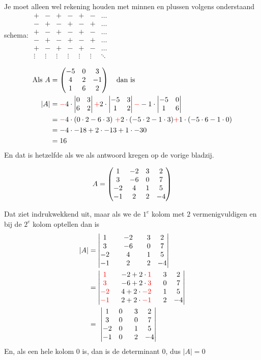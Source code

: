 Je moet alleen wel rekening houden met minnen en plussen volgens onderstaand schema:
$ \begin{matrix}
    +  & - & + & - & + & - & \ldots \\
    -  & + & - & + & - & + & \ldots \\
    +  & - & + & - & + & - & \ldots \\
    -  & + & - & + & - & + & \ldots \\
    +  & - & + & - & + & - & \ldots \\
    \vdots & \vdots & \vdots & \vdots & \vdots & \vdots & \ddots
\end{matrix}  $

\begin{align*}
    	\text{Als } A &= \matdrie{-5 & 0 & 3}{4 & 2 & -1}{1 & 6 & 2} \quad \text{dan is} \\ 
    	         |A| &= \red{-}4\cdot  \dettwee{0 & 3}{6 & 2 }  
                         \red{+}2\cdot  \dettwee{-5 & 3}{1 & 2 }
                         \red{-}-1\cdot \dettwee{-5 & 0}{1 & 6 }\\
    	           &= \red{-}4\cdot (0\cdot 2-6\cdot 3)\ 
                         \red{+}2\cdot (-5\cdot 2-1\cdot 3) 
                         \red{+}1\cdot (-5\cdot 6-1\cdot 0)\\
    	           &= -4\cdot -18 +2\cdot -13 +1\cdot -30\\
    	           &= 16
\end{align*}
En dat is hetzelfde als we als antwoord kregen op de vorige bladzij.


\[
    A = \begin{pmatrix}  1 & -2 & 3 & 2  \\  3 & -6 & 0 & 7  \\  -2 & 4 & 1 & 5  \\  -1 & 2 & 2 & -4  \end{pmatrix}
\]

Dat ziet indrukwekkend uit, maar als we de $1^e$ kolom met $2$ vermenigvuldigen en bij de $2^e$ kolom optellen dan is 
\begin{align*}
    |A| &= \detvier{1 & & -2 &  & 3 & 2}{3 & & -6 & & 0 & 7}{-2 & & 4 & & 1 & 5}{-1 & & 2 & & 2 & -4} \\
        &= \detvier{ \red{1}  & \ \ -2+2\cdot \red{1} & \ \ 3 & 2 }
                    { \red{3}  & \ \ -6+2\cdot \red{3} & \ \ 0 & 7 }
                    { \red{-2} & \ \ 4+2\cdot \red{-2} & \ \ 1 & 5 }
                    { \red{-1} & \ \ 2+2\cdot \red{-1} & \ \ 2 & -4} \\
        &= \ \detvier{ 1 & 0 & \ \ 3 & 2 }{ 3 & 0 & \ \ 0 & 7 }{ -2 & 0 & \ \ 1 & 5 }{ -1 & 0 & \ \ 2 & -4} 
\end{align*} 
En, als een hele kolom $0$ is, dan is de determinant $0$, dus $|A| = 0$
 
